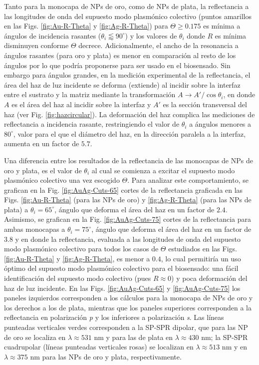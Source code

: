 Tanto para la monocapa de NPs de oro, como de NPs de plata, la reflectancia a las longitudes de onda del supuesto modo plasmónico colectivo (puntos amarillos en las Figs. \ref{fig:Au-R-Theta} y \ref{fig:Ag-R-Theta}) para  $\Theta\geq 0.175$ es mínima a ángulos de incidencia rasantes ($\theta_i\lessapprox 90^\circ$) y los valores de $\theta_i$ donde $R$ es mínima disminuyen conforme $\Theta$ decrece.  Adicionalmente, el ancho de la resonancia a ángulos rasantes (para oro y plata) es menor en comparación al resto de los ángulos por lo que podría proponerse para ser usado en el biosensado. Sin embargo para ángulos grandes, en la medición experimental de la reflectancia, el área del haz de luz incidente se deforma (extiende) al incidir sobre la interfaz entre el sustrato y la matriz mediante la transformación $A\to A'/\cos\theta_i$, en donde $A$ es el área del haz al incidir sobre la interfaz  y $A'$ es la sección transversal del haz (ver Fig. \ref{fig:hazcircular}). La deformación del haz complica las mediciones de reflectancia a incidencia rasante, restringiendo el valor de $\theta_i$ a ángulos menores a $80^\circ$, valor para el que el diámetro del haz, en la dirección paralela a la interfaz, aumenta en un factor de $5.7$.

Una diferencia entre los resultados de la reflectancia de las monocapas de NPs de oro y plata, es el valor de $\theta_i$ al cual se comienza a excitar el supuesto modo plasmónico colectivo una vez escogido $\Theta$. Para analizar este comportamiento, se grafican en la Fig. \ref{fig:AuAg-Cuts-65} cortes de la reflectancia graficada en las Figs. \ref{fig:Au-R-Theta} (para las NPs de oro) y \ref{fig:Ag-R-Theta} (para las NPs de plata) a $\theta_i=65^\circ$,  ángulo que deforma el área del haz en un factor de $2.4$. Asimismo, se grafican en la Fig. \ref{fig:AuAg-Cuts-75} cortes de la reflectancia para ambas monocapas a $\theta_i=75^\circ$, ángulo que deforma el área del haz en un factor de $3.8$ y en donde  la reflectancia, evaluada a las longitudes de onda del supuesto modo plasmónico colectivo para todos los casos de $\Theta$ estudiados en las Figs.  \ref{fig:Au-R-Theta} y  \ref{fig:Ag-R-Theta}, es menor a $0.4$, lo cual permitiría un uso óptimo  del supuesto modo plasmónico colectivo para el biosensado: una fácil identificación del supuesto modo colectivo (pues $R\approx 0$) y poca deformación del haz de luz incidente. En las Figs. \ref{fig:AuAg-Cuts-65} y \ref{fig:AuAg-Cuts-75} los paneles izquierdos corresponden a los cálculos para la monocapa de NPs de oro y los derechos a los de plata, mientras que los paneles superiores corresponden a la reflectancia en polarización \emph{p} y los inferiores a polarización \emph{s}. Las líneas punteadas verticales verdes corresponden a la SP-SPR dipolar,  que para las NP de oro se localiza en $\lambda\approx 531$ nm y para las de plata en $\lambda\approx 430$ nm; la SP-SPR cuadrupolar (líneas punteadas verticales rosas) se localizan en $\lambda\approx 513$ nm y en $ \lambda\approx 375$ nm para las NPs de oro y plata, respectivamente.

